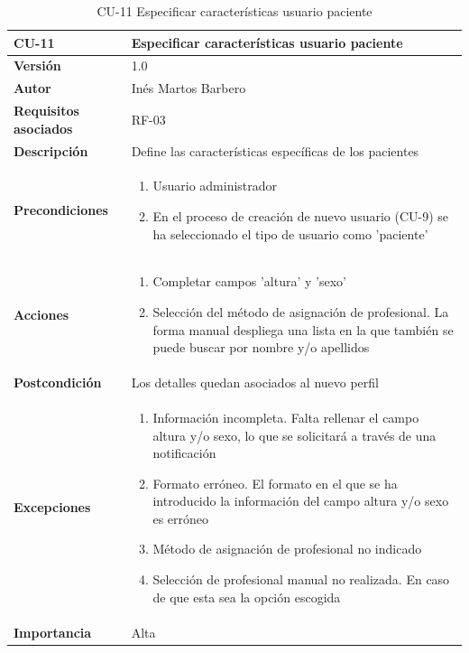 \begin{table}[p]
	\centering
	\begin{tabularx}{\linewidth}{ p{} p{} }
		\toprule
		\textbf{CU-11}    & \textbf{Especificar características usuario paciente}\\
		\toprule
		\textbf{Versión}              & 1.0    \\
		\textbf{Autor}                & Inés Martos Barbero \\
		\textbf{Requisitos asociados} & RF-03 \\
		\textbf{Descripción}          & Define las características específicas de los pacientes \\
		\textbf{Precondiciones}         & 
            \begin{enumerate}
    			\def\labelenumi{\arabic{enumi}.}
    			\tightlist
    			\item Usuario administrador
    			\item En el proceso de creación de nuevo usuario (CU-9) se ha seleccionado el tipo de usuario como 'paciente'
    		\end{enumerate}\\
		\textbf{Acciones}             &
		\begin{enumerate}
			\def\labelenumi{\arabic{enumi}.}
			\tightlist
			\item Completar campos 'altura' y 'sexo'
			\item Selección del método de asignación de profesional. La forma manual despliega una lista en la que también se puede buscar por nombre y/o apellidos
		\end{enumerate}\\
        \textbf{Postcondición}        & Los detalles quedan asociados al nuevo perfil \\
        \textbf{Excepciones}          & 
            \begin{enumerate}
    			\def\labelenumi{\arabic{enumi}.}
    			\tightlist
    			\item Información incompleta. Falta rellenar el campo altura y/o sexo, lo que se solicitará a través de una notificación
                \item Formato erróneo. El formato en el que se ha introducido la información del campo altura y/o sexo es erróneo
                \item Método de asignación de profesional no indicado
    			\item Selección de profesional manual no realizada. En caso de que esta sea la opción escogida
    		\end{enumerate}\\
		\textbf{Importancia}          & Alta \\
		\bottomrule
	\end{tabularx}
	\caption{CU-11 Especificar características usuario paciente}
    \label{CU-11}
\end{table}

